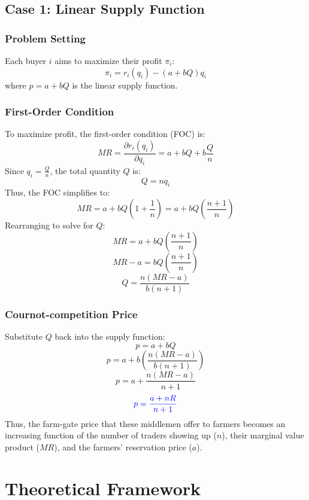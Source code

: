 \documentclass[12pt]{article}
\begin{document}
\subsection{Case 1: Linear Supply Function}

\subsubsection*{Problem Setting}

Each buyer \( i \) aims to maximize their profit \( \pi_i \):
\[
\pi_i = r_i(q_i) - (a + bQ)q_i
\]
where \( p = a + bQ \) is the linear supply function.

\subsubsection*{First-Order Condition}

To maximize profit, the first-order condition (FOC) is:
\[
MR = \frac{\partial r_i(q_i)}{\partial q_i} = a + bQ + b \frac{Q}{n}
\]
Since \( q_i = \frac{Q}{n} \), the total quantity \( Q \) is:
\[
Q = nq_i
\]
Thus, the FOC simplifies to:
\[
MR = a + bQ \left(1 + \frac{1}{n}\right) = a + bQ \left(\frac{n+1}{n}\right)
\]
Rearranging to solve for \( Q \):
\[
MR = a + bQ \left(\frac{n+1}{n}\right)
\]
\[
MR - a = bQ \left(\frac{n+1}{n}\right)
\]
\[
Q = \frac{n(MR - a)}{b(n+1)}
\]

\subsubsection*{Cournot-competition Price}

Substitute \( Q \) back into the supply function:
\[
p = a + bQ
\]
\[
p = a + b \left( \frac{n(MR - a)}{b(n+1)} \right)
\]
\[
p = a + \frac{n(MR - a)}{n+1}
\]
\begin{equation}
    \textcolor{blue}{p = \frac{a + nR}{n+1}}
    \label{Eq: optimal procure price, linear supply case}
\end{equation}
Thus, the farm-gate price that these middlemen offer to farmers becomes an increasing function of the number of traders showing up ($n$), their marginal value product ($MR$), and the farmers' reservation price ($a$).


\newpage
\section{Theoretical Framework}
\end{document}
